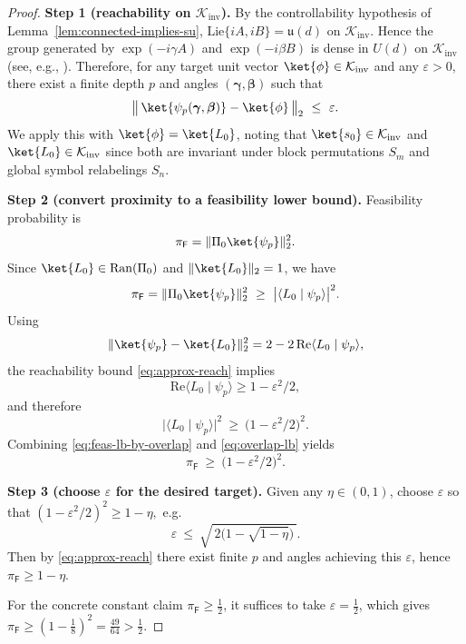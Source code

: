 \documentclass[a4paper,unpublished,onecolumn,11pt]{quantumarticle}
\theoremstyle{definition}
\theoremstyle{remark}
\begin{document}
\begin{proof}

\textbf{Step 1 (reachability on $\mathcal K_{\mathrm{inv}}$).}
By the controllability hypothesis of Lemma~\ref{lem:connected-implies-su},
$\mathrm{Lie}\{iA,iB\}=\mathfrak u(d)$ on $\mathcal K_{\mathrm{inv}}$.
Hence the group generated by $\exp(-i\gamma A)$ and $\exp(-i\beta B)$ is dense in $U(d)$ on
$\mathcal K_{\mathrm{inv}}$ (see, e.g., \cite{DAlessandro2007,Altafini2002}).
Therefore, for any target unit vector $\ket{\phi}\in\mathcal K_{\mathrm{inv}}$ and any $\varepsilon>0$,
there exist a finite depth $p$ and angles $(\boldsymbol\gamma,\boldsymbol\beta)$ such that
\begin{equation}
\label{eq:approx-reach}
\bigl\|\,\ket{\psi_p(\boldsymbol\gamma,\boldsymbol\beta)}-\ket{\phi}\,\bigr\|_2 \ \le\ \varepsilon.
\end{equation}
We apply this with $\ket{\phi}=\ket{L_0}$, noting that $\ket{s_0}\in\mathcal K_{\mathrm{inv}}$ and
$\ket{L_0}\in\mathcal K_{\mathrm{inv}}$ since both are invariant under block permutations $S_m$
and global symbol relabelings $S_n$.

\textbf{Step 2 (convert proximity to a feasibility lower bound).}
Feasibility probability is
\[
\pi_{\mathsf F}
=\|\Pi_0\ket{\psi_p}\|_2^2.
\]
Since $\ket{L_0}\in\mathrm{Ran}(\Pi_0)$ and $\|\ket{L_0}\|_2=1$, we have
\begin{equation}
\label{eq:feas-lb-by-overlap}
\pi_{\mathsf F}
=\|\Pi_0\ket{\psi_p}\|_2^2
\ \ge\
\bigl|\langle L_0\mid \psi_p\rangle\bigr|^2.
\end{equation}
Using
\[
\|\ket{\psi_p}-\ket{L_0}\|_2^2
=2-2\,\mathrm{Re}\langle L_0\mid \psi_p\rangle,
\]
the reachability bound \eqref{eq:approx-reach} implies
\[
\mathrm{Re}\langle L_0\mid \psi_p\rangle \ge 1-\varepsilon^2/2,
\]
and therefore
\begin{equation}
\label{eq:overlap-lb}
\bigl|\langle L_0\mid \psi_p\rangle\bigr|^2
\ \ge\
\bigl(1-\varepsilon^2/2\bigr)^2.
\end{equation}
Combining \eqref{eq:feas-lb-by-overlap} and \eqref{eq:overlap-lb} yields
\[
\pi_{\mathsf F}\ \ge\ \bigl(1-\varepsilon^2/2\bigr)^2.
\]

\textbf{Step 3 (choose $\varepsilon$ for the desired target).}
Given any $\eta\in(0,1)$, choose $\varepsilon$ so that
\(
(1-\varepsilon^2/2)^2\ge 1-\eta,
\)
e.g.
\[
\varepsilon
\ \le\
\sqrt{\,2\bigl(1-\sqrt{1-\eta}\bigr)\,}.
\]
Then by \eqref{eq:approx-reach} there exist finite $p$ and angles achieving this $\varepsilon$,
hence $\pi_{\mathsf F}\ge 1-\eta$.

For the concrete constant claim $\pi_{\mathsf F}\ge \tfrac12$, it suffices to take $\varepsilon=\tfrac12$, which gives
\(
\pi_{\mathsf F}\ge (1-\tfrac{1}{8})^2=\tfrac{49}{64}>\tfrac12.
\)
\end{proof}
\end{document}
